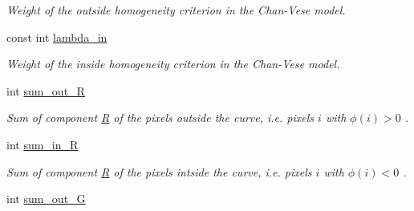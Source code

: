 \begin{DoxyCompactItemize}
\begin{DoxyCompactList}\small\item\em Weight of the outside homogeneity criterion in the Chan-\/\-Vese model. \end{DoxyCompactList}\item 
\hypertarget{classofeli_1_1_a_cwithout_edges_y_u_v_a311f8c97d1fbdcdbb76b1b09aea59212}{const int \hyperlink{classofeli_1_1_a_cwithout_edges_y_u_v_a311f8c97d1fbdcdbb76b1b09aea59212}{lambda\-\_\-in}}\label{classofeli_1_1_a_cwithout_edges_y_u_v_a311f8c97d1fbdcdbb76b1b09aea59212}

\begin{DoxyCompactList}\small\item\em Weight of the inside homogeneity criterion in the Chan-\/\-Vese model. \end{DoxyCompactList}\item 
\hypertarget{classofeli_1_1_a_cwithout_edges_y_u_v_ad0f0935437296539710e4886afc94397}{int \hyperlink{classofeli_1_1_a_cwithout_edges_y_u_v_ad0f0935437296539710e4886afc94397}{sum\-\_\-out\-\_\-\-R}}\label{classofeli_1_1_a_cwithout_edges_y_u_v_ad0f0935437296539710e4886afc94397}

\begin{DoxyCompactList}\small\item\em Sum of component \hyperlink{classofeli_1_1_a_cwithout_edges_y_u_v_a2590133637eb415a75ba848efb3d15d0}{R} of the pixels outside the curve, i.\-e. pixels $i$ with $\phi \left( i\right) >0$ . \end{DoxyCompactList}\item 
\hypertarget{classofeli_1_1_a_cwithout_edges_y_u_v_aba49728a621675acf3279f38134afc1f}{int \hyperlink{classofeli_1_1_a_cwithout_edges_y_u_v_aba49728a621675acf3279f38134afc1f}{sum\-\_\-in\-\_\-\-R}}\label{classofeli_1_1_a_cwithout_edges_y_u_v_aba49728a621675acf3279f38134afc1f}

\begin{DoxyCompactList}\small\item\em Sum of component \hyperlink{classofeli_1_1_a_cwithout_edges_y_u_v_a2590133637eb415a75ba848efb3d15d0}{R} of the pixels intside the curve, i.\-e. pixels $i$ with $\phi \left( i\right) <0$ . \end{DoxyCompactList}\item 
\hypertarget{classofeli_1_1_a_cwithout_edges_y_u_v_a5ac2c58a2f10125ee7c2c21e80a321cc}{int \hyperlink{classofeli_1_1_a_cwithout_edges_y_u_v_a5ac2c58a2f10125ee7c2c21e80a321cc}{sum\-\_\-out\-\_\-\-G}}\label{classofeli_1_1_a_cwithout_edges_y_u_v_a5ac2c58a2f10125ee7c2c21e80a321cc}


\end{DoxyCompactItemize}
